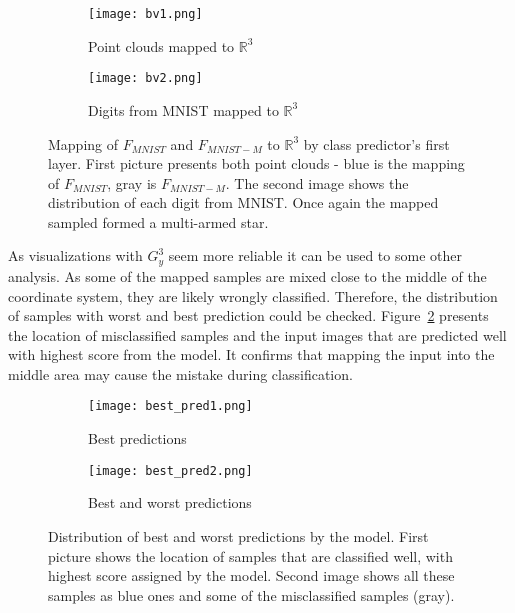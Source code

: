 \documentclass[shortabstract, inz, english]{iithesis}
\begin{document}
\begin{figure}[htb]%
    \centering
    \begin{subfigure}[b]{0.48\textwidth}
        \texttt{[image: bv1.png]}
        \caption{Point clouds mapped to $\mathbb{R}^{3}$}
    \end{subfigure}%
    \begin{subfigure}[b]{0.48\textwidth}
        \texttt{[image: bv2.png]}
        \caption{Digits from MNIST mapped to $\mathbb{R}^{3}$}
    \end{subfigure}%
    \captionsetup{belowskip=0pt}
    \caption{Mapping of $F_{MNIST}$ and $F_{MNIST-M}$ to $\mathbb{R}^{3}$ by class predictor's first layer. First picture presents both point clouds - blue is the mapping of $F_{MNIST}$, gray is $F_{MNIST-M}$. The second image shows the distribution of each digit from MNIST. Once again the mapped sampled formed a multi-armed star.}%
    \label{fig:vis_class_pred}%
\end{figure}
\par
As visualizations with $G_{y}^{3}$ seem more reliable it can be used to some other analysis. As some of the mapped samples are mixed close to the middle of the coordinate system, they are likely wrongly classified. Therefore, the distribution of samples with worst and best prediction could be checked. Figure~\ref{fig:best_pred} presents the location of misclassified samples and the input images that are predicted well with highest score from the model. It confirms that mapping the input into the middle area may cause the mistake during classification.
\begin{figure}[!htbp]%
    \centering
    \begin{subfigure}[b]{0.48\textwidth}
        \texttt{[image: best\_pred1.png]}
        \caption{Best predictions}
    \end{subfigure}%
    \begin{subfigure}[b]{0.48\textwidth}
        \texttt{[image: best\_pred2.png]}
        \caption{Best and worst predictions}
    \end{subfigure}%
    \caption{Distribution of best and worst predictions by the model. First picture shows the location of samples that are classified well, with highest score assigned by the model. Second image shows all these samples as blue ones and some of the misclassified samples (gray).}%
    \label{fig:best_pred}%
\end{figure}
\end{document}
